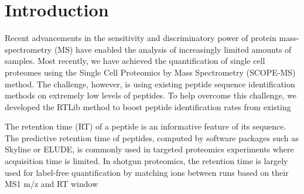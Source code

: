 
%
%

\date{}






\section{Introduction}

Recent advancements in the sensitivity and discriminatory power of protein mass-spectrometry (MS) have enabled the analysis of increasingly limited amounts of samples. Most recently, we have achieved the quantification of single cell proteomes using the Single Cell Proteomics by Mass Spectrometry (SCOPE-MS) method. The challenge, however, is using existing peptide sequence identification methods on extremely low levels of peptides. 
To help overcome this challenge, we developed the RTLib method to boost peptide identification rates from existing  


The retention time (RT) of a peptide is an informative feature of its sequence. The predictive retention time of peptides, computed by software packages such as Skyline or ELUDE, is commonly used in targeted proteomics experiments where acquisition time is limited. In shotgun proteomics, the retention time is largely used for label-free quantification by matching ions between runs based on their MS1 m/z and RT window %


